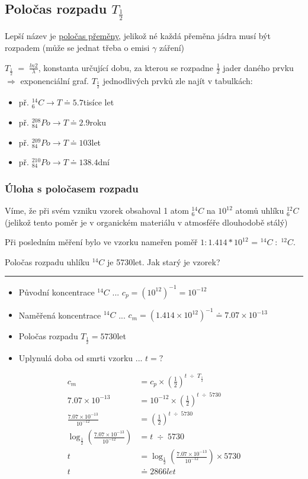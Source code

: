 \subsection{Poločas rozpadu $T_{\frac{1}{2}}$}
Lepší název je \underline{poločas přeměny}, jelikož né každá přeměna jádra musí být rozpadem (může se jednat třeba o emisi $\gamma$ záření)

$T_{\frac{1}{2}} \; = \; \frac{ln2}{\lambda}$, konstanta určující dobu, za kterou se rozpadne $\frac{1}{2}$ jader daného prvku $\Rightarrow$ exponenciální graf.
\textbf{$T_{\frac{1}{2}}$} jednodlivých prvků zle najít v tabulkách: 
\begin{itemize}
    \item př. $^{14}_6C \rightarrow T \doteq 5.7$tisíce let
    \item př. $^{208}_{84}Po \rightarrow T \doteq 2.9$roku
    \item př. $^{209}_{84}Po \rightarrow T \doteq 103$let
    \item př. $^{210}_{84}Po \rightarrow T \doteq 138.4$dní
\end{itemize}

\newpage
\subsubsection{Úloha s poločasem rozpadu}

Víme, že při svém vzniku vzorek obsahoval 1 atom $^{14}_6C$ na $10^{12}$ atomů uhlíku $^{12}_6C$ (jelikož tento poměr je v organickém materiálu v atmosféře dlouhodobě stálý)

Při posledním měření bylo ve vzorku nameřen poměř $1 : 1.414*10^{12}$ = $^{14}C \; : \;^{12}C$.

Poločas rozpadu uhlíku $^{14}C$ je 5730let. Jak starý je vzorek?

\rule{5em}{1px}

\begin{itemize}
    \item Původní koncentrace $^{14}C$ ... $c_p = (10^{12})^{-1} = 10^{-12}$
    \item Naměřená koncentrace $^{14}C$ ... $c_m = (1.414 \times 10^{12})^{-1} \doteq 7.07 \times 10^{-13}$
    \item Poločas rozpadu $T_{\frac{1}{2}} = 5730$let
    \item Uplynulá doba od smrti vzorku ... $t = ?$
\end{itemize}

\begin{align*}
    c_{m} &= c_{p} \times \left(\frac{1}{2}\right)^{t \; \div \;  T_{\frac{1}{2}}} \\
    7.07 \times 10^{-13} &= 10^{-12} \times \left(\frac{1}{2}\right)^{t \; \div \;  5730} \\
    \frac{7.07 \times 10^{-13}}{10^{-12}} &= \left(\frac{1}{2}\right)^{t \; \div \;  5730} \\
    \log_{\frac{1}{2}}\left(\frac{7.07 \times 10^{-13}}{10^{-12}}\right) &= t \; \div \;  5730 \\
    t &= \log_{\frac{1}{2}}\left(\frac{7.07 \times 10^{-13}}{10^{-12}}\right) \times 5730 \\
    t &\doteq 2866 let
\end{align*}

